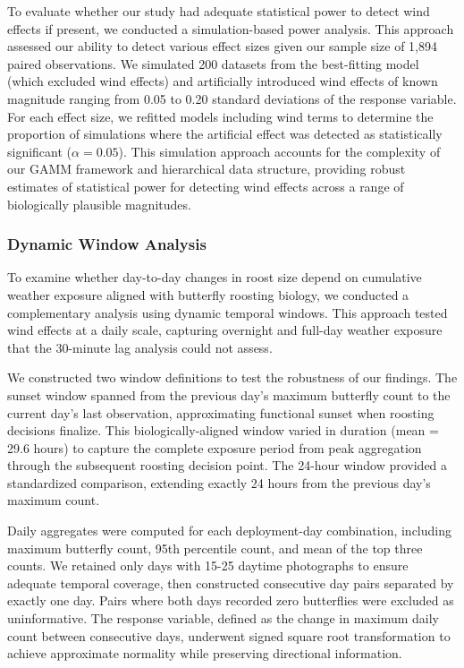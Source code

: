 To evaluate whether our study had adequate statistical power to detect wind effects if present, we conducted a simulation-based power analysis. This approach assessed our ability to detect various effect sizes given our sample size of 1,894 paired observations. We simulated 200 datasets from the best-fitting model (which excluded wind effects) and artificially introduced wind effects of known magnitude ranging from 0.05 to 0.20 standard deviations of the response variable. For each effect size, we refitted models including wind terms to determine the proportion of simulations where the artificial effect was detected as statistically significant ($\alpha = 0.05$). This simulation approach accounts for the complexity of our GAMM framework and hierarchical data structure, providing robust estimates of statistical power for detecting wind effects across a range of biologically plausible magnitudes.

\subsubsection{Dynamic Window Analysis}

To examine whether day-to-day changes in roost size depend on cumulative weather exposure aligned with butterfly roosting biology, we conducted a complementary analysis using dynamic temporal windows. This approach tested wind effects at a daily scale, capturing overnight and full-day weather exposure that the 30-minute lag analysis could not assess.

We constructed two window definitions to test the robustness of our findings. The sunset window spanned from the previous day's maximum butterfly count to the current day's last observation, approximating functional sunset when roosting decisions finalize. This biologically-aligned window varied in duration (mean = 29.6 hours) to capture the complete exposure period from peak aggregation through the subsequent roosting decision point. The 24-hour window provided a standardized comparison, extending exactly 24 hours from the previous day's maximum count.

Daily aggregates were computed for each deployment-day combination, including maximum butterfly count, 95th percentile count, and mean of the top three counts. We retained only days with 15-25 daytime photographs to ensure adequate temporal coverage, then constructed consecutive day pairs separated by exactly one day. Pairs where both days recorded zero butterflies were excluded as uninformative. The response variable, defined as the change in maximum daily count between consecutive days, underwent signed square root transformation to achieve approximate normality while preserving directional information.

